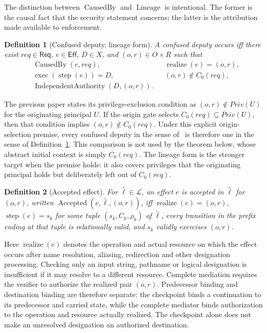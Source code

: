 \documentclass[10pt,twocolumn]{article}
\newcommand{\Lineages}{\mathcal{L}}
\newcommand{\exec}{\operatorname{exec}}
\newtheorem{definition}{Definition}
\begin{document}
The distinction between \(\operatorname{CausedBy}\) and
\(\operatorname{Lineage}\) is intentional. The former is the causal fact that
the security statement concerns; the latter is the attribution made available
to enforcement.

\begin{definition}[Confused deputy, lineage form]\label{def:cd}
A confused deputy occurs iff there exist
\(req\in\mathsf{Req}\), \(e\in\mathsf{Eff}\), \(D\in X\), and
\((o,r)\in O\times R\) such that
\[
\begin{aligned}
&\operatorname{CausedBy}(e,req),
&&\operatorname{realize}(e)=(o,r),\\
&\exec(\operatorname{step}(e))=D,
&&(o,r)\notin C_0(req),\\
&\operatorname{IndependentAuthority}(D,(o,r)).
\end{aligned}
\]
\end{definition}

The previous paper states its privilege-exclusion condition as
\((o,r)\notin Priv(U)\) for the originating principal \(U\). If the origin gate
selects \(C_0(req)\subseteq Priv(U)\), then that condition implies
\((o,r)\notin C_0(req)\). Under this explicit origin-selection premise, every
confused deputy in the sense of~\cite{gallo2026poc} is therefore one in the
sense of Definition~\ref{def:cd}. This comparison is not used by the theorem
below, whose abstract initial context is simply \(C_0(req)\). The lineage form
is the stronger target when the premise holds: it also covers privileges that
the originating principal holds but deliberately left out of \(C_0(req)\).

\begin{definition}[Accepted effect]\label{def:accepted}
For \(\widehat{\ell}\in\Lineages\), an effect \(e\) is \emph{accepted} in
\(\widehat{\ell}\) for \((o,r)\), written
\(\operatorname{Accepted}(e,\widehat{\ell},(o,r))\), iff
\(\operatorname{realize}(e)=(o,r)\),
\(\operatorname{step}(e)=s_k\) for some tuple \((s_k,C_k,\rho_k)\) of
\(\widehat{\ell}\), every transition in the prefix ending at that tuple is
relationally valid, and \(s_k\) validly exercises \((o,r)\).
\end{definition}

Here \(\operatorname{realize}(e)\) denotes the operation and actual resource on
which the effect occurs after name resolution, aliasing, redirection and other
designation processing. Checking only an input string, pathname or logical
designation is insufficient if it may resolve to a different resource. Complete
mediation requires the verifier to authorize the realized pair \((o,r)\).
Predecessor binding and destination binding are therefore separate: the
checkpoint binds a continuation to its predecessor and carried state, while the
complete mediator binds authorization to the operation and resource actually
realized. The checkpoint alone does not make an unresolved designation an
authorized destination.
\end{document}
